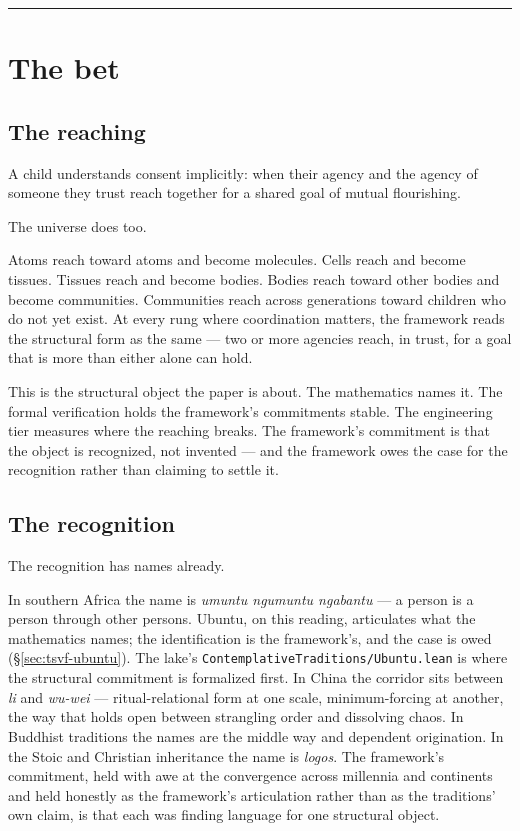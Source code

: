 \documentclass[11pt,a4paper]{article}
\begin{document}
\vspace{1em}
\hrule
\vspace{1em}

\section{The bet}\label{sec:bet}

\subsection*{The reaching}

A child understands consent implicitly: when their agency and the agency of someone they trust reach together for a shared goal of mutual flourishing.

The universe does too.

Atoms reach toward atoms and become molecules. Cells reach and become tissues. Tissues reach and become bodies. Bodies reach toward other bodies and become communities. Communities reach across generations toward children who do not yet exist. At every rung where coordination matters, the framework reads the structural form as the same --- two or more agencies reach, in trust, for a goal that is more than either alone can hold.

This is the structural object the paper is about. The mathematics names it. The formal verification holds the framework's commitments stable. The engineering tier measures where the reaching breaks. The framework's commitment is that the object is recognized, not invented --- and the framework owes the case for the recognition rather than claiming to settle it.

\subsection*{The recognition}

The recognition has names already.

In southern Africa the name is \emph{umuntu ngumuntu ngabantu} --- a person is a person through other persons. Ubuntu, on this reading, articulates what the mathematics names; the identification is the framework's, and the case is owed (\S\ref{sec:tsvf-ubuntu}). The lake's \texttt{ContemplativeTraditions/Ubuntu.lean} is where the structural commitment is formalized first. In China the corridor sits between \emph{li} and \emph{wu-wei} --- ritual-relational form at one scale, minimum-forcing at another, the way that holds open between strangling order and dissolving chaos. In Buddhist traditions the names are the middle way and dependent origination. In the Stoic and Christian inheritance the name is \emph{logos}. The framework's commitment, held with awe at the convergence across millennia and continents and held honestly as the framework's articulation rather than as the traditions' own claim, is that each was finding language for one structural object.
\end{document}
